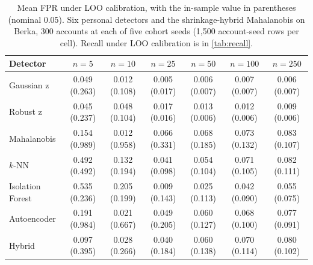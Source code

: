 \begin{table}[!t]
\caption{Mean FPR under LOO calibration, with the in-sample value in parentheses (nominal 0.05). Six personal detectors and the shrinkage-hybrid Mahalanobis on Berka, 300 accounts at each of five cohort seeds (1{,}500 account-seed rows per cell). Recall under LOO calibration is in \cref{tab:recall}.}
\label{tab:fpr_all}
\centering\footnotesize\setlength{\tabcolsep}{5pt}
\begin{tabular}{l cccccc}
\toprule
Detector & $n=5$ & $n=10$ & $n=25$ & $n=50$ & $n=100$ & $n=250$ \\
\midrule
Gaussian z       & 0.049 (0.263) & 0.012 (0.108) & 0.005 (0.017) & 0.006 (0.007) & 0.007 (0.007) & 0.006 (0.007) \\
Robust z         & 0.045 (0.237) & 0.048 (0.104) & 0.017 (0.016) & 0.013 (0.006) & 0.012 (0.006) & 0.009 (0.006) \\
Mahalanobis      & 0.154 (0.989) & 0.012 (0.958) & 0.066 (0.331) & 0.068 (0.185) & 0.073 (0.132) & 0.083 (0.107) \\
$k$-NN           & 0.492 (0.492) & 0.132 (0.194) & 0.041 (0.098) & 0.054 (0.104) & 0.071 (0.105) & 0.082 (0.111) \\
Isolation Forest & 0.535 (0.236) & 0.205 (0.199) & 0.009 (0.143) & 0.025 (0.113) & 0.042 (0.090) & 0.055 (0.075) \\
Autoencoder      & 0.191 (0.984) & 0.021 (0.667) & 0.049 (0.205) & 0.060 (0.127) & 0.068 (0.100) & 0.077 (0.091) \\
Hybrid           & 0.097 (0.395) & 0.028 (0.266) & 0.040 (0.184) & 0.060 (0.138) & 0.070 (0.114) & 0.080 (0.102) \\
\bottomrule
\end{tabular}
\end{table}

